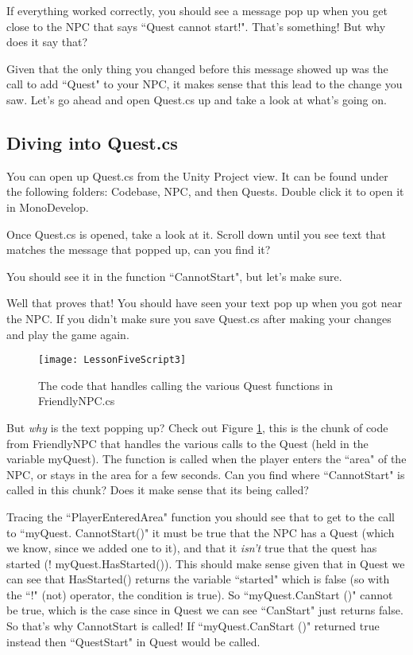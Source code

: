 \documentclass{article}
\begin{document}
If everything worked correctly, you should see a message pop up when you get close to the NPC that says ``Quest cannot start!". That's something! But why does it say that?

Given that the only thing you changed before this message showed up was the call to add ``Quest" to your NPC, it makes sense that this lead to the change you saw. Let's go ahead and open Quest.cs up and take a look at what's going on. 

\subsection{Diving into Quest.cs}

You can open up Quest.cs from the Unity Project view. It can be found under the following folders: Codebase, NPC, and then Quests. Double click it to open it in MonoDevelop. 

Once Quest.cs is opened, take a look at it. Scroll down until you see text that matches the message that popped up, can you find it? 

You should see it in the function ``CannotStart", but let's make sure.

\noindent{}

Well that proves that! You should have seen your text pop up when you got near the NPC. If you didn't make sure you save Quest.cs after making your changes and play the game again.

\begin{figure}
  \texttt{[image: LessonFiveScript3]}
  \caption{The code that handles calling the various Quest functions in FriendlyNPC.cs}
  \label{fig:LessonFiveScript3}
\end{figure}

But \textit{why} is the text popping up? Check out Figure \ref{fig:LessonFiveScript3}, this is the chunk of code from FriendlyNPC that handles the various calls to the Quest (held in the variable myQuest). The function is called when the player enters the ``area" of the NPC, or stays in the area for a few seconds. Can you find where ``CannotStart" is called in this chunk? Does it make sense that its being called? 

Tracing the ``PlayerEnteredArea" function you should see that to get to the call to ``myQuest. CannotStart()" it must be true that the NPC has a Quest (which we know, since we added one to it), and that it \textit{isn't } true that the quest has started (! myQuest.HasStarted()). This should make sense given that in Quest we can see that HasStarted() returns the variable ``started" which is false (so with the ``!" (not) operator, the condition is true). So ``myQuest.CanStart ()" cannot be true, which is the case since in Quest we can see ``CanStart" just returns false. So that's why CannotStart is called! If ``myQuest.CanStart ()" returned true instead then ``QuestStart" in Quest would be called. 
\end{document}
